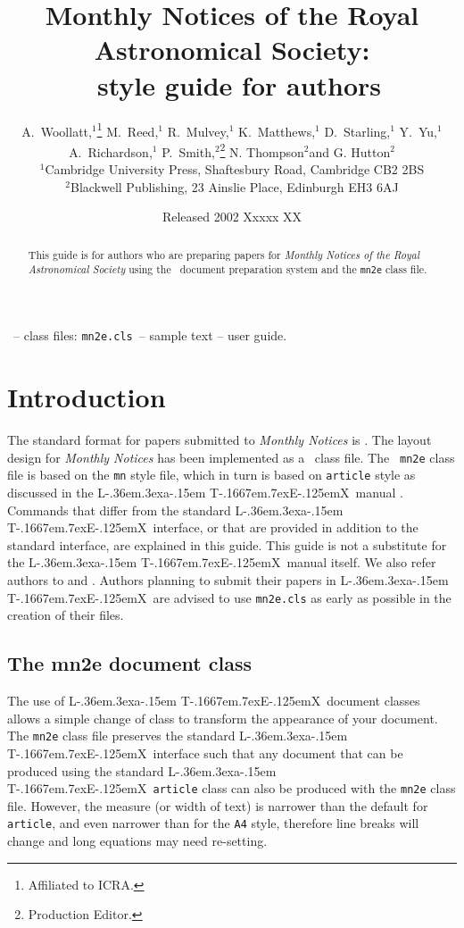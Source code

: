 \documentclass[useAMS,usenatbib]{mn2e}
\title[Monthly Notices: \LaTeXe\ guide for authors]
  {Monthly Notices of the Royal Astronomical
  Society: \\ \LaTeXe\ style guide for authors}
\author[A. Woollatt et al.]
  {A.~Woollatt,$^1$\thanks{Affiliated to ICRA.}
  M.~Reed,$^1$ R.~Mulvey,$^1$ K.~Matthews,$^1$
  D.~Starling,$^1$ Y.~Yu,$^1$
  \newauthor %
  A.~Richardson,$^1$
  P.~Smith,$^2$\thanks{Production Editor.}
  N. Thompson$^2$\footnotemark[2]
  and G. Hutton$^2$\footnotemark[2] \\
  $^1$Cambridge University Press, Shaftesbury
      Road, Cambridge CB2 2BS\\
  $^2$Blackwell Publishing,
      23 Ainslie Place, Edinburgh EH3 6AJ}
\date{Released 2002 Xxxxx XX}
\def\LaTeX{L\kern-.36em\raise.3ex\hbox{a}\kern-.15em
    T\kern-.1667em\lower.7ex\hbox{E}\kern-.125emX}
\begin{document}
\label{firstpage}

\maketitle

\begin{abstract}
 This guide is for authors who are preparing papers for
 \textit{Monthly Notices of the Royal Astronomical Society} using the
\LaTeXe\ document preparation system and the {\tt mn2e} class file.
\end{abstract}

\begin{keywords}
 \LaTeXe\ -- class files: \verb"mn2e.cls"\ -- sample text -- user guide.
\end{keywords}

\section{Introduction}

The standard format for papers submitted to \textit{Monthly
Notices} is \LaTeXe. The layout design for \textit{Monthly
Notices} has been implemented as a \LaTeXe\ class file. The {\tt
mn2e} class file is based on the {\tt mn} style file, which in
turn is based on \verb"article" style as discussed in the \LaTeX\
manual \citep{la}. Commands that differ from the standard \LaTeX\
interface, or that are provided in addition to the standard
interface, are explained in this guide. This guide is not a
substitute for the \LaTeX\ manual itself. We also refer authors to
\citet{kd} and \citet{kn}. Authors planning to submit their papers
in \LaTeX\ are advised to use \verb"mn2e.cls" as early as possible
in the creation of their files.

\subsection{The mn2e document class}

The use of \LaTeX\ document classes allows a simple change of class to
transform the appearance of your document. The {\tt mn2e} class file
preserves the standard \LaTeX\ interface such that any document that can be
produced using the standard \LaTeX\ \verb"article" class can also be
produced with the {\tt mn2e} class file. However, the measure (or width of
text) is narrower than the default for \verb"article", and even narrower
than for the \verb"A4" style, therefore line breaks will change and long
equations may need re-setting.
\end{document}
